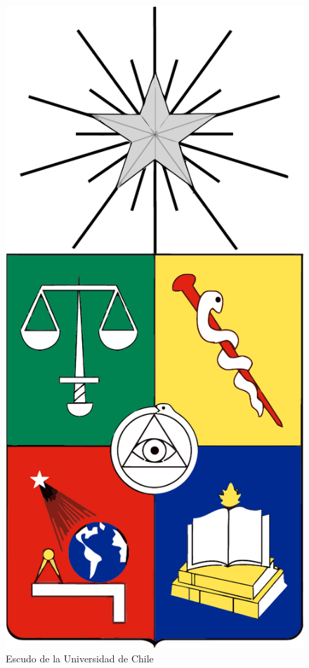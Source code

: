 \documentclass[11pt,letterpaper]{article}
\begin{document}
\begin{figure}[ht!]
\centering \includegraphics[scale=0.2]{img/escudoU.pdf}
\caption{Escudo de la Universidad de Chile} \label{img2}
\end{figure}
\end{document}
